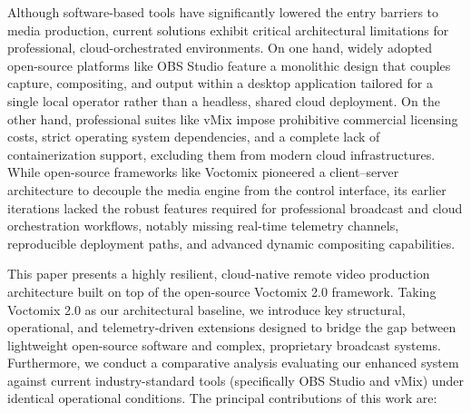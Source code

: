 \documentclass[electronics,article,submit,pdftex,moreauthors]{Definitions/mdpi}
\begin{document}
Although software-based tools have significantly lowered the entry barriers to media production, current solutions exhibit critical architectural limitations for professional, cloud-orchestrated environments. On one hand, widely adopted open-source platforms like OBS Studio feature a monolithic design that couples capture, compositing, and output within a desktop application tailored for a single local operator rather than a headless, shared cloud deployment. On the other hand, professional suites like vMix impose prohibitive commercial licensing costs, strict operating system dependencies, and a complete lack of containerization support, excluding them from modern cloud infrastructures. While open-source frameworks like Voctomix pioneered a client–server architecture to decouple the media engine from the control interface, its earlier iterations lacked the robust features required for professional broadcast and cloud orchestration workflows, notably missing real-time telemetry channels, reproducible deployment paths, and advanced dynamic compositing capabilities.


This paper presents a highly resilient, cloud-native remote video production architecture built on top of the open-source Voctomix 2.0 framework. Taking Voctomix 2.0 as our architectural baseline, we introduce key structural, operational, and telemetry-driven extensions designed to bridge the gap between lightweight open-source software and complex, proprietary broadcast systems. Furthermore, we conduct a comparative analysis evaluating our enhanced system against current industry-standard tools (specifically OBS Studio and vMix) under identical operational conditions. The principal contributions of this work are:
\end{document}
